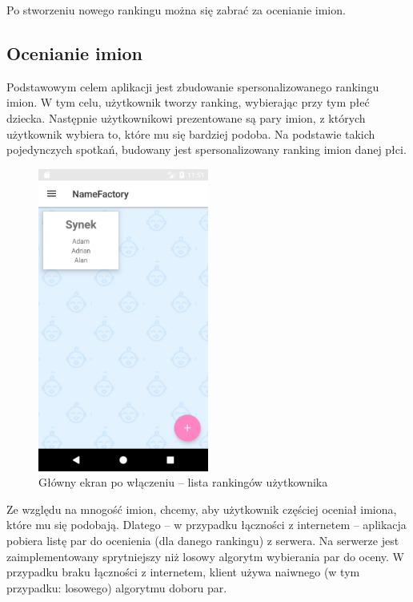 \documentclass[12pt,a4paper]{article}
\begin{document}
Po stworzeniu nowego rankingu można się zabrać za ocenianie imion.

\subsection{Ocenianie imion}

Podstawowym celem aplikacji jest zbudowanie spersonalizowanego rankingu imion.
W tym celu, użytkownik tworzy ranking, wybierając przy tym płeć dziecka.
Następnie użytkownikowi prezentowane są pary imion, z których użytkownik wybiera to, które mu się bardziej podoba.
Na podstawie takich pojedynczych spotkań, budowany jest spersonalizowany ranking imion danej płci.

\begin{figure}[h]
    \caption{Główny ekran po włączeniu -- lista rankingów użytkownika}
    \centering
    \includegraphics[width=0.5\textwidth]{rankings}
\end{figure}

Ze względu na mnogość imion, chcemy, aby użytkownik częściej oceniał imiona, które mu się podobają.
Dlatego -- w przypadku łączności z internetem -- aplikacja pobiera listę par do ocenienia (dla danego rankingu) z serwera.
Na serwerze jest zaimplementowany sprytniejszy niż losowy algorytm wybierania par do oceny.
W przypadku braku łączności z internetem, klient używa naiwnego (w tym przypadku: losowego) algorytmu doboru par.
\end{document}
